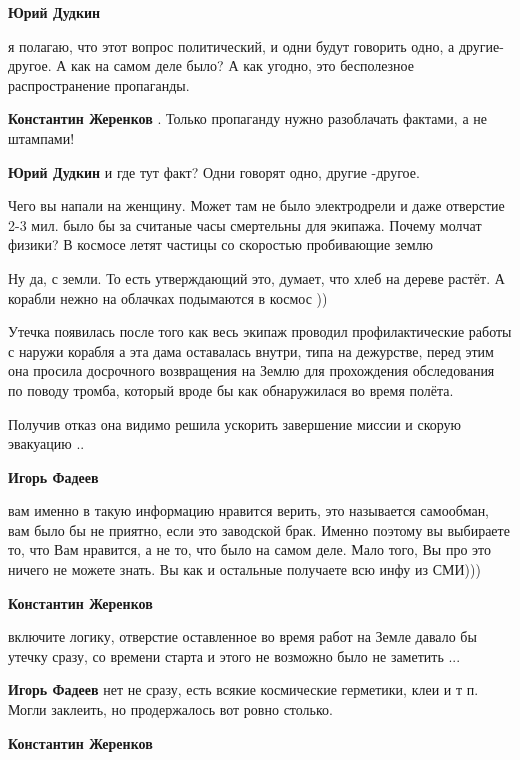 \begin{itemize}
\begin{itemize}
\textbf{Юрий Дудкин} 

я полагаю, что этот вопрос политический, и одни будут говорить одно, а
другие-другое. А как на самом деле было? А как угодно, это бесполезное
распространение пропаганды.

\textbf{Константин Жеренков} . Только пропаганду нужно разоблачать фактами, а не штампами!

\textbf{Юрий Дудкин} и где тут факт? Одни говорят одно, другие -другое.


Чего вы напали на женщину. Может там не было электродрели и даже отверстие 2-3
мил. было бы за считаные часы смертельны для экипажа. Почему молчат физики? В
космосе летят частицы со скоростью пробивающие землю


Ну да, с земли. То есть утверждающий это, думает, что хлеб на дереве растёт. А
корабли нежно на облачках подымаются в космос ))


Утечка появилась после того как весь экипаж проводил профилактические работы с
наружи корабля а эта дама оставалась внутри, типа на дежурстве, перед этим она
просила досрочного возвращения на Землю для прохождения обследования по поводу
тромба, который вроде бы как обнаружилася во время полёта.

Получив отказ она видимо решила ускорить завершение миссии и скорую эвакуацию
..

\textbf{Игорь Фадеев} 

вам именно в такую информацию нравится верить, это называется самообман, вам
было бы не приятно, если это заводской брак. Именно поэтому вы выбираете то,
что Вам нравится, а не то, что было на самом деле. Мало того, Вы про это ничего
не можете знать. Вы как и остальные получаете всю инфу из СМИ)))


\textbf{Константин Жеренков} 

включите логику, отверстие оставленное во время работ на Земле давало бы утечку
сразу, со времени старта и этого не возможно было не заметить ...

\textbf{Игорь Фадеев} нет не сразу, есть всякие космические герметики, клеи и т п. Могли заклеить, но продержалось вот ровно столько.

\textbf{Константин Жеренков} 


\end{itemize}
\end{itemize}

